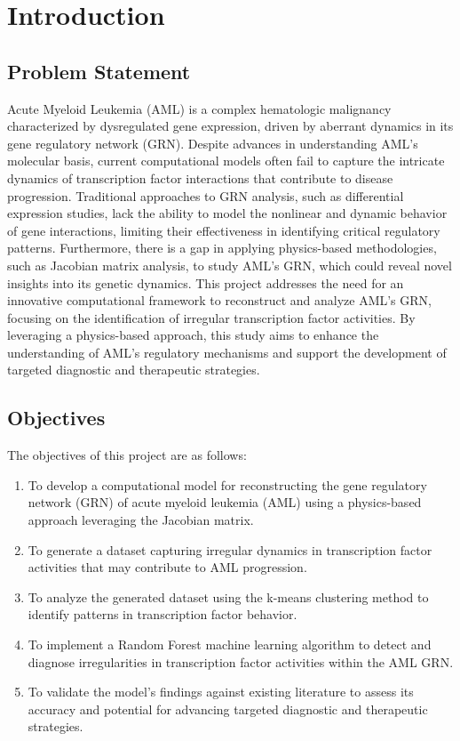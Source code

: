 \documentclass[a4paper,12pt]{article}
\begin{document}
\clearpage
\tableofcontents


\clearpage
\section{Introduction}
\subsection{Problem Statement}
Acute Myeloid Leukemia (AML) is a complex hematologic malignancy characterized by dysregulated gene expression, driven by aberrant dynamics in its gene regulatory network (GRN). Despite advances in understanding AML’s molecular basis, current computational models often fail to capture the intricate dynamics of transcription factor interactions that contribute to disease progression. Traditional approaches to GRN analysis, such as differential expression studies, lack the ability to model the nonlinear and dynamic behavior of gene interactions, limiting their effectiveness in identifying critical regulatory patterns. Furthermore, there is a gap in applying physics-based methodologies, such as Jacobian matrix analysis, to study AML’s GRN, which could reveal novel insights into its genetic dynamics. This project addresses the need for an innovative computational framework to reconstruct and analyze AML’s GRN, focusing on the identification of irregular transcription factor activities. By leveraging a physics-based approach, this study aims to enhance the understanding of AML’s regulatory mechanisms and support the development of targeted diagnostic and therapeutic strategies.

\subsection{Objectives}
The objectives of this project are as follows:
\begin{enumerate}
	\item To develop a computational model for reconstructing the gene regulatory network (GRN) of acute myeloid leukemia (AML) using a physics-based approach leveraging the Jacobian matrix.
	\item To generate a dataset capturing irregular dynamics in transcription factor activities that may contribute to AML progression.
	\item To analyze the generated dataset using the k-means clustering method to identify patterns in transcription factor behavior.
	\item To implement a Random Forest machine learning algorithm to detect and diagnose irregularities in transcription factor activities within the AML GRN.
	\item To validate the model’s findings against existing literature to assess its accuracy and potential for advancing targeted diagnostic and therapeutic strategies.
\end{enumerate}
\end{document}
